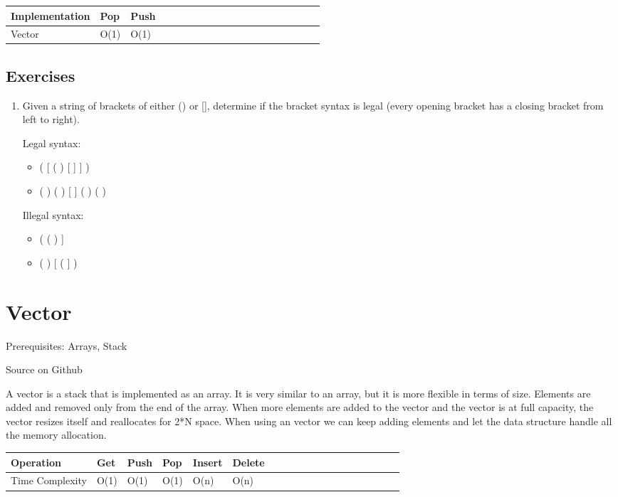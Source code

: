\documentclass[11pt,oneside]{book}
\begin{document}
\vspace{10pt} \begin{tabular}{|l|l|l|l|l|l|l|l|l|l|l|l|l|l|l|l|l|l|l}\hline


  Implementation &
  Pop &
  Push\\
\hline


  Vector &
  O(1) &
  O(1)\\

\hline\end{tabular}

\subsection{Exercises}

\begin{enumerate}
\item Given a string of brackets of either () or [], determine if the bracket syntax is legal (every opening bracket has a closing bracket from left to right).

Legal syntax:

\begin{itemize}
\item ( [ ( ) [ ] ] )
\item ( ) ( ) [ ] ( ) ( )
\end{itemize}

Illegal syntax:

\begin{itemize}
\item ( ( ) ]
\item ( ) [ ( ] )
\end{itemize}
\end{enumerate}
\section{Vector}

Prerequisites: Arrays, Stack

Source on Github

A vector is a stack that is implemented as an array. It is very similar to an array, but it is more flexible in terms of size. Elements are added and removed only from the end of the array. When more elements are added to the vector and the vector is at full capacity, the vector resizes itself and reallocates for 2*N space. When using an vector we can keep adding elements and let the data structure handle all the memory allocation.

\vspace{10pt} \begin{tabular}{|l|l|l|l|l|l|l|l|l|l|l|l|l|l|l|l|l|l|l}\hline


  Operation &
  Get &
  Push &
  Pop &
  Insert &
  Delete\\
\hline


  Time Complexity &
  O(1) &
  O(1) &
  O(1) &
  O(n) &
  O(n)\\

\hline\end{tabular}
\end{document}
